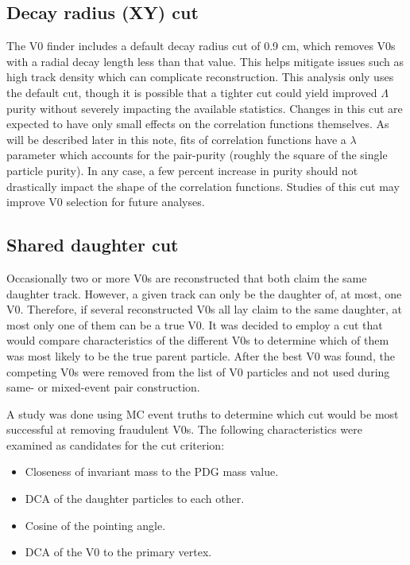 \subsection{Decay radius (XY) cut}
The V0 finder includes a default decay radius cut of 0.9 cm, which removes V0s with a radial decay length less than that value.  
This helps mitigate issues such as high track density which can complicate reconstruction.  
This analysis only uses the default cut, though it is possible that a tighter cut could yield improved $\Lambda$ purity without severely impacting the available statistics.  
Changes in this cut are expected to have only small effects on the correlation functions themselves.  
As will be described later in this note, fits of correlation functions have a $\lambda$ parameter which accounts for the pair-purity (roughly the square of the single particle purity).  
In any case, a few percent increase in purity should not drastically impact the shape of the correlation functions.
Studies of this cut may improve V0 selection for future analyses.

\subsection{Shared daughter cut}

Occasionally two or more V0s are reconstructed that both claim the same daughter track.  
However, a given track can only be the daughter of, at most, one V0.  
Therefore, if several reconstructed V0s all lay claim to the same daughter, at most only one of them can be a true V0.  
It was decided to employ a cut that would compare characteristics of the different V0s to determine which of them was most likely to be the true parent particle.  
After the best V0 was found, the competing V0s were removed from the list of V0 particles and not used during same- or mixed-event pair construction.

A study was done using MC event truths to determine which cut would be most successful at removing fraudulent V0s.  
The following characteristics were examined as candidates for the cut criterion:

\begin{itemize}
\item Closeness of invariant mass to the PDG mass value.
\item DCA of the daughter particles to each other.
\item Cosine of the pointing angle.
\item DCA of the V0 to the primary vertex.
\end{itemize}

